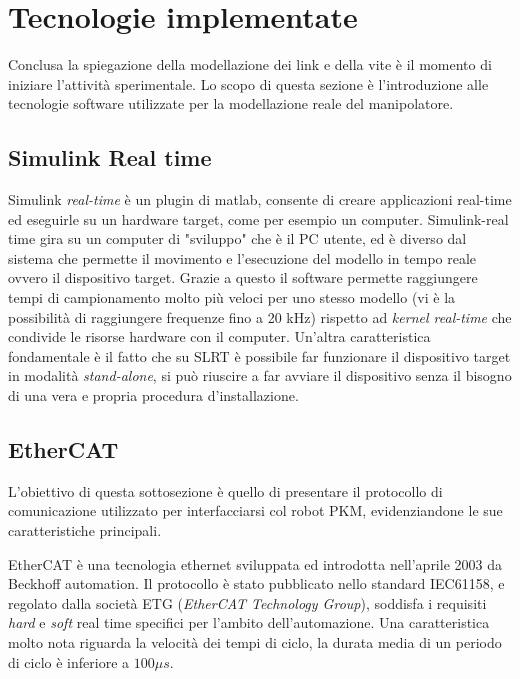 \section{Tecnologie implementate}
Conclusa la spiegazione della modellazione dei link e della vite è il momento di iniziare l'attività sperimentale. Lo scopo di questa sezione è l'introduzione alle tecnologie software utilizzate per la modellazione reale del manipolatore.
\subsection{Simulink Real time}
Simulink \textit{real-time} è un plugin di matlab, consente di creare applicazioni real-time ed eseguirle su un hardware target, come per esempio un computer. Simulink-real time gira su un computer di "sviluppo" che è il PC utente, ed è diverso dal sistema che permette il movimento e l'esecuzione del modello in tempo reale ovvero il dispositivo target. Grazie a questo il software permette raggiungere tempi di campionamento molto più veloci per uno stesso modello (vi è la possibilità di raggiungere frequenze fino a 20 kHz) rispetto ad \textit{kernel real-time} che condivide le risorse hardware con il computer.
Un'altra caratteristica fondamentale è il fatto che su SLRT è possibile far funzionare il dispositivo target in modalità \textit{stand-alone}, si può riuscire a far avviare il dispositivo senza il bisogno di una vera e propria procedura d'installazione.

\subsection{EtherCAT}
L'obiettivo di questa sottosezione è quello di presentare il protocollo di comunicazione utilizzato per interfacciarsi col robot PKM, evidenziandone le sue caratteristiche principali.
\par EtherCAT è una tecnologia ethernet sviluppata ed introdotta nell'aprile 2003 da Beckhoff automation. Il protocollo è stato pubblicato nello standard IEC61158, e regolato dalla società ETG (\textit{EtherCAT Technology Group}), soddisfa i requisiti \textit{hard} e \textit{soft} real time specifici per l'ambito dell'automazione. Una caratteristica molto nota riguarda la velocità dei tempi di ciclo, la durata media di un periodo di ciclo è inferiore a $100 \mu s$. 
